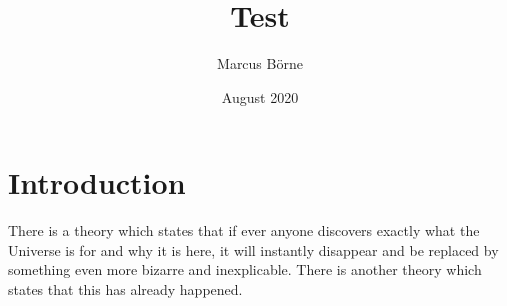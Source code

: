 \documentclass{article}
\title{Test}
\author{Marcus Börne}
\date{August 2020}
\begin{document}
\maketitle

\section{Introduction}
There is a theory which states that if ever anyone discovers exactly what the Universe is for and why it is here, it will instantly disappear and be replaced by something even more bizarre and inexplicable.
There is another theory which states that this has already happened.

\begin{figure}[h!]
\centering
\end{figure}
\end{document}

